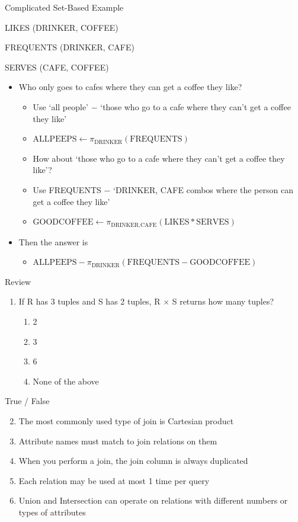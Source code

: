 \documentclass[aspectratio=169]{beamer}
\newenvironment{noindentitemize}
{ \begin{itemize}
 \setlength{\itemsep}{1.5ex}
  \setlength{\parsep}{0pt}   
  \setlength{\parskip}{0pt}
 \addtolength{\leftskip}{-2em}
 }
{ \end{itemize} }
\newenvironment{noindentitemize2}
{ \begin{itemize}
  \setlength{\itemsep}{0ex}
  \setlength{\parskip}{0pt}
  \setlength{\parsep}{0pt}   
  \addtolength{\leftskip}{-2em}  }
{ \end{itemize} }
\newcommand{\LIKES}{\textrm{LIKES}}
\newcommand{\FREQUENTS}{\textrm{FREQUENTS}}
\newcommand{\SERVES}{\textrm{SERVES}}
\newcommand{\CAFE}{\textrm{CAFE}}
\newcommand{\DRINKER}{\textrm{DRINKER}}
\newcommand{\ALLPEEPS}{\textrm{ALLPEEPS}}
\newcommand{\GOODCOFFEE}{\textrm{GOODCOFFEE}}
\begin{document}
\begin{frame}{Complicated Set-Based Example}

LIKES (DRINKER, COFFEE)

FREQUENTS (DRINKER, CAFE)

SERVES (CAFE, COFFEE)

\begin{noindentitemize}
\item Who only goes to cafes where they can get a coffee they like?
	\begin{noindentitemize2}
	\item Use `all people' $-$ `those who go to a cafe where they can't get a coffee they like'
	\item $\ALLPEEPS \leftarrow \pi_{\DRINKER}(\FREQUENTS)$
	\item How about `those who go to a cafe where they can't get a coffee they like'?
	\item Use FREQUENTS $-$ `DRINKER, CAFE combos where the person can get a coffee they like'
	\item $\GOODCOFFEE \leftarrow \pi_{\DRINKER, \CAFE}(\LIKES * \SERVES)$
	\end{noindentitemize2}
\item Then the answer is 
	\begin{noindentitemize2}
	\item $\ALLPEEPS - \pi_{\DRINKER}(\FREQUENTS - \GOODCOFFEE)$
	\end{noindentitemize2}
\end{noindentitemize}
\end{frame}

\begin{frame}{Review}
\begin{enumerate}
\item If R has 3 tuples and S has 2 tuples, R $\times$ S returns how many tuples?
\begin{enumerate}[A]
\item 2
\item 3
\item 6
\item None of the above
\end{enumerate}
\end{enumerate}
True / False
\begin{enumerate}
\setcounter{enumi}{1}
\item The most commonly used type of join is Cartesian product
\item Attribute names must match to join relations on them
\item When you perform a join, the join column is always duplicated
\item Each relation may be used at most 1 time per query
\item Union and Intersection can operate on relations with different numbers or types of attributes

\end{enumerate}
\end{frame}
\end{document}
